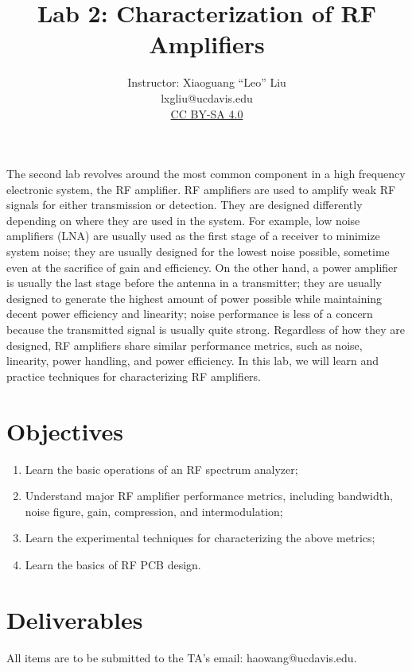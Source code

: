 \documentclass[letterpaper, 11pt]{article}
\begin{document}
\title{Lab 2: Characterization of RF Amplifiers}
\author{Instructor: Xiaoguang ``Leo'' Liu\\lxgliu@ucdavis.edu \\
	\small \href{http://creativecommons.org/licenses/by-sa/4.0/}{CC BY-SA 4.0}}
\date{}

\maketitle

The second lab revolves around the most common component in a high frequency electronic system, the RF amplifier. RF amplifiers are used to amplify weak RF signals for either transmission or detection. They are designed differently depending on where they are used in the system. For example, low noise amplifiers (LNA) are usually used as the first stage of a receiver to minimize system noise; they are usually designed for the lowest noise possible, sometime even at the sacrifice of gain and efficiency. On the other hand, a power amplifier is usually the last stage before the antenna in a transmitter; they are usually designed to generate the highest amount of power possible while maintaining decent power efficiency and linearity; noise performance is less of a concern because the transmitted signal is usually quite strong. Regardless of how they are designed, RF amplifiers share similar performance metrics, such as noise, linearity, power handling, and power efficiency. In this lab, we will learn and practice techniques for characterizing RF amplifiers. 

\section{Objectives}

\begin{enumerate}[itemsep=0.1ex]
	\item Learn the basic operations of an RF spectrum analyzer;
	\item Understand major RF amplifier performance metrics, including bandwidth, noise figure, gain, compression, and intermodulation;
	\item Learn the experimental techniques for characterizing the above metrics;
	\item Learn the basics of RF PCB design. 
\end{enumerate}

\newpage
\section{Deliverables}
All items are to be submitted to the TA's email: haowang@ucdavis.edu.  
\end{document}
